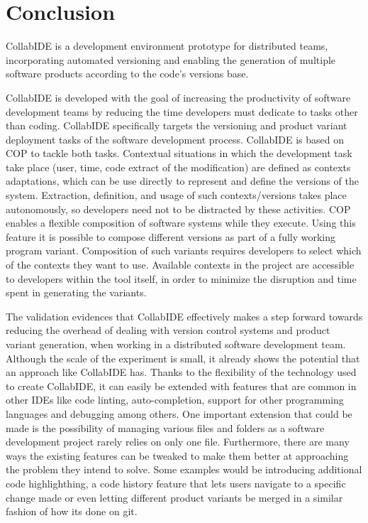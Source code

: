 
\section{Conclusion}
\label{sec:conclusion}

CollabIDE is a development environment prototype for distributed teams, incorporating automated versioning and enabling the generation of multiple software products according to the code's versions base.

CollabIDE is developed with the goal of increasing the productivity of software development teams by reducing the time developers must dedicate to tasks other than coding. CollabIDE specifically targets the versioning and product variant deployment tasks of the software development process. CollabIDE is based on \ac{COP} to tackle both tasks. Contextual situations in which the development task take place (\eg user, time, code extract of the modification) are defined as contexts adaptations, which can be use directly to represent and define the versions of the system. Extraction, definition, and usage of such contexts/versions takes place autonomously, so developers need not to be distracted by these activities. 
\ac{COP} enables a flexible composition of software systems while they execute. Using this feature it is possible to compose different versions as part of a fully working program variant. Composition of such variants requires developers to select which of the contexts they want to use. Available contexts in the project are accessible to developers within the tool itself, in order to minimize the disruption and time spent in generating the variants.

The validation evidences that CollabIDE effectively makes a step forward towards reducing the overhead of dealing with version control systems and product variant generation, when working in a distributed software development team.
Although the scale of the experiment is small, it already shows the potential that an approach like 
CollabIDE has. Thanks to the flexibility of the technology used to create CollabIDE, it can easily be extended with features that are common in other IDEs like code linting, auto-completion, support for other programming languages and debugging among others. One important extension that could be made is the possibility of managing various files and folders as a software development project rarely relies on only one file. Furthermore, there are many ways the existing features can be tweaked to make them better at approaching the problem they intend to solve. Some examples would be introducing additional code highlighthing, a code history feature that lets users navigate to a specific change made or even letting different product variants be merged in a similar fashion of how its done on git. 

